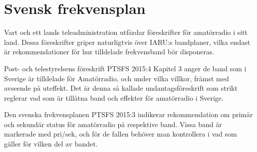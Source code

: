 \chapter{Svensk frekvensplan}
\label{svensk frekvensplan}

Vart och ett lands teleadministration utfärdar föreskrifter för amatörradio
i sitt land.
Dessa föreskrifter griper naturligtvis över IARU:s bandplaner, vilka endast
är rekommendationer för hur tilldelade frekvensband bör disponeras.

Post- och telestyrelsens föreskrift PTSFS 2015:4 \cite{PTSFS2015:4} Kapitel 3
anger de band som i Sverige är tilldelade för Amatörradio, och under vilka
villkor, främst med avseende på uteffekt.
Det är denna så kallade undantagsföreskrift som strikt reglerar vad som är
tillåtna band och effekter för amatörradio i Sverige.

Den svenska frekvensplanen PTSFS 2015:3 \cite{PTSFS2015:3} indikerar
rekommendation om primär och sekundär status för amatörradio på respektive
band.
Vissa band är markerade med pri/sek, och för de fallen behöver man
kontrollera i \cite{PTSFS2015:3} vad som gäller för vilken del av bandet.

